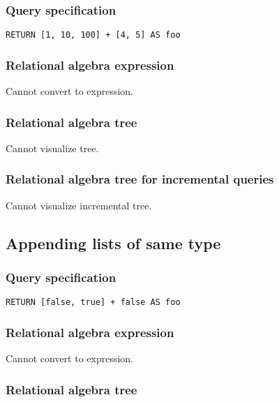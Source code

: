 \subsubsection*{Query specification}

\begin{lstlisting}
RETURN [1, 10, 100] + [4, 5] AS foo
\end{lstlisting}

\subsubsection*{Relational algebra expression}

Cannot convert to expression.

\subsubsection*{Relational algebra tree}

Cannot visualize tree.

\subsubsection*{Relational algebra tree for incremental queries}

Cannot visualize incremental tree.

\subsection{Appending lists of same type}

\subsubsection*{Query specification}

\begin{lstlisting}
RETURN [false, true] + false AS foo
\end{lstlisting}

\subsubsection*{Relational algebra expression}

Cannot convert to expression.

\subsubsection*{Relational algebra tree}

